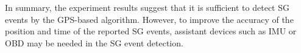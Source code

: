 \documentclass[final,oneside,onecolumn,12pt,a4paper]{book}%
\begin{document}
In summary, the experiment results suggest that it is sufficient to detect SG
events by the GPS-based algorithm. However, to improve the accuracy of the
position and time of the reported SG events, assistant devices such as IMU or
OBD may be needed in the SG event detection.
\end{document}
